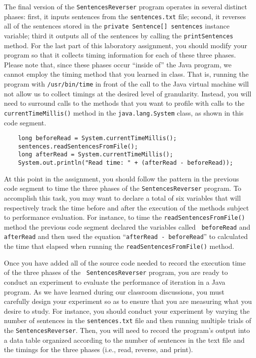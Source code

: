 The final version of the {\tt SentencesReverser} program operates in several distinct phases: first, it inputs sentences
from the {\tt sentences.txt} file; second, it reverses all of the sentences stored in the {\tt private Sentence[]
sentences} instance variable; third it outputs all of the sentences by calling the {\tt printSentences} method. For the
last part of this laboratory assignment, you should modify your program so that it collects timing information for each
of these three phases. Please note that, since these phases occur ``inside of'' the Java program, we cannot employ the
timing method that you learned in class. That is, running the program with {\tt /usr/bin/time} in front of the call to
the Java virtual machine will not allow us to collect timings at the desired level of granularity. Instead, you will
need to surround calls to the methods that you want to profile with calls to the {\tt currentTimeMillis()} method in the
{\tt java.lang.System} class, as shown in this code segment.

\begin{verbatim}
    long beforeRead = System.currentTimeMillis();
    sentences.readSentencesFromFile();
    long afterRead = System.currentTimeMillis();
    System.out.println("Read time: " + (afterRead - beforeRead));
\end{verbatim}

At this point in the assignment, you should follow the pattern in the previous code segment to time the three phases of
the {\tt SentencesReverser} program. To accomplish this task, you may want to declare a total of six variables that will
respectively track the time before and after the execution of the methods subject to performance evaluation. For
instance, to time the {\tt readSentencesFromFile()} method the previous code segment declared the variables called {\tt
beforeRead} and {\tt afterRead} and then used the equation ``{\tt afterRead - beforeRead}'' to calculated the time that
elapsed when running the {\tt readSentencesFromFile()} method.

Once you have added all of the source code needed to record the execution time of the three phases of the {\tt
SentencesReverser} program, you are ready to conduct an experiment to evaluate the performance of iteration in a Java
program. As we have learned during our classroom discussions, you must carefully design your experiment so as to ensure
that you are measuring what you desire to study. For instance, you should conduct your experiment by varying the number
of sentences in the {\tt sentences.txt} file and then running multiple trials of the {\tt SentencesReverser}. Then, you
will need to record the program's output into a data table organized according to the number of sentences in the text
file and the timings for the three phases (i.e., read, reverse, and print).

